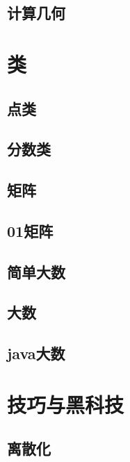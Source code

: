 \section{计算几何}
\raggedbottom
\hrulefill

\chapter{类}
\section{点类}
\raggedbottom
\hrulefill
\section{分数类}
\raggedbottom
\hrulefill
\section{矩阵}
\raggedbottom
\hrulefill
\section{01矩阵}
\raggedbottom
\hrulefill
\section{简单大数}
\raggedbottom
\hrulefill
\section{大数}
\raggedbottom
\hrulefill
\section{java大数}
\raggedbottom
\hrulefill

\chapter{技巧与黑科技}
\section{离散化}
\raggedbottom
\hrulefill
